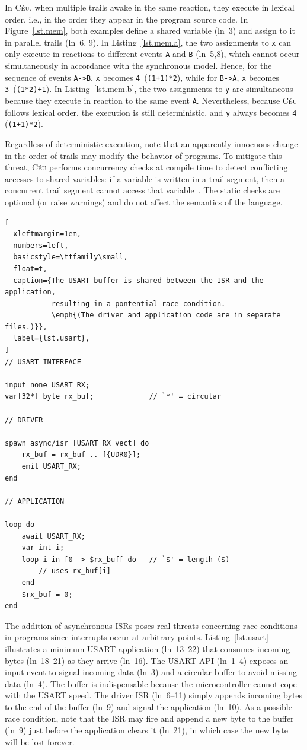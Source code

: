 \documentclass[sigplan,10pt,review,anonymous]{acmart}\settopmatter{printfolios=true,printccs=false,printacmref=false}
\newcommand{\CEU}{\textsc{C\'{e}u}\xspace}
\newcommand{\code}[1] {{\small{\texttt{#1}}}}
\begin{document}
In \CEU, when multiple trails awake in the same reaction, they execute in
lexical order, i.e., in the order they appear in the program source code.
%
In Figure~\ref{lst.mem}, both examples define a shared variable (ln~3) and
assign to it in parallel trails (ln~6, 9).
%
In Listing~\ref{lst.mem.a}, the two assignments to \code{x} can only execute in
reactions to different events \code{A} and \code{B} (ln~5,8), which cannot
occur simultaneously in accordance with the synchronous model.
Hence, for the sequence of events \code{A->B}, \code{x} becomes
\code{4}~(\code{(1+1)*2}), while for \code{B->A}, \code{x} becomes
\code{3}~(\code{(1*2)+1}).
In Listing~\ref{lst.mem.b}, the two assignments to \code{y} are simultaneous
because they execute in reaction to the same event \code{A}.
Nevertheless, because \CEU follows lexical order, the execution is still
deterministic, and \code{y} always becomes \code{4} (\code{(1+1)*2}).

Regardless of deterministic execution, note that an apparently innocuous change
in the order of trails may modify the behavior of programs.
%
To mitigate this threat, \CEU performs concurrency checks at compile time to
detect conflicting accesses to shared variables:
if a variable is written in a trail segment, then a concurrent trail segment
cannot access that variable~\cite{ceu.sensys13}.
%
The static checks are optional (or raise warnings) and do not affect the
semantics of the language.

\begin{lstlisting}[
  xleftmargin=1em,
  numbers=left,
  basicstyle=\ttfamily\small,
  float=t,
  caption={The USART buffer is shared between the ISR and the application,
           resulting in a pontential race condition.
           \emph{(The driver and application code are in separate files.)}},
  label={lst.usart},
]
// USART INTERFACE

input none USART_RX;
var[32*] byte rx_buf;             // `*' = circular

// DRIVER

spawn async/isr [USART_RX_vect] do
    rx_buf = rx_buf .. [{UDR0}];
    emit USART_RX;
end

// APPLICATION

loop do
    await USART_RX;
    var int i;
    loop i in [0 -> $rx_buf[ do   // `$' = length ($)
        // uses rx_buf[i]
    end
    $rx_buf = 0;
end
\end{lstlisting}

The addition of asynchronous ISRs poses real threats concerning race conditions
in programs since interrupts occur at arbitrary points.
%
Listing~\ref{lst.usart} illustrates a minimum USART application (ln~13--22)
that consumes incoming bytes (ln~18--21) as they arrive (ln~16).
%
The USART API (ln~1--4) exposes an input event to signal incoming data (ln~3)
and a circular buffer to avoid missing data (ln~4).
The buffer is indispensable because the microcontroller cannot cope with the
USART speed.
%
The driver ISR (ln~6--11) simply appends incoming bytes to the end of the
buffer (ln~9) and signal the application (ln~10).
%
As a possible race condition, note that the ISR may fire and append a new byte
to the buffer (ln~9) just before the application clears it (ln~21), in which
case the new byte will be lost forever.
\end{document}
